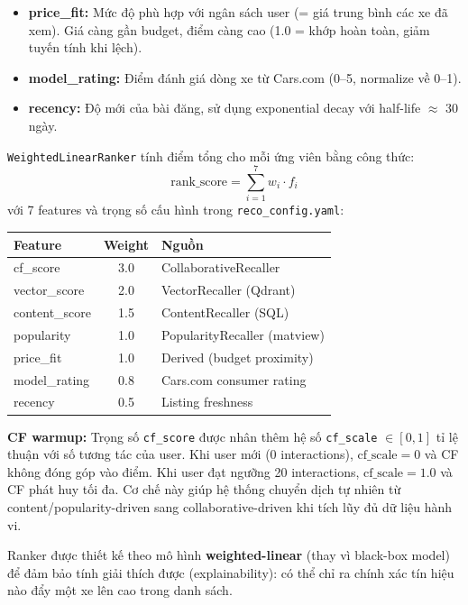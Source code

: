 \begin{itemize}
    \item \textbf{price\_fit:} Mức độ phù hợp với ngân sách user (= giá trung bình các xe đã xem). Giá càng gần budget, điểm càng cao (1.0 = khớp hoàn toàn, giảm tuyến tính khi lệch).
    \item \textbf{model\_rating:} Điểm đánh giá dòng xe từ Cars.com (0--5, normalize về 0--1).
    \item \textbf{recency:} Độ mới của bài đăng, sử dụng exponential decay với half-life $\approx$ 30 ngày.
\end{itemize}

\texttt{WeightedLinearRanker} tính điểm tổng cho mỗi ứng viên bằng công thức:
\[
\text{rank\_score} = \sum_{i=1}^{7} w_i \cdot f_i
\]
với 7 features và trọng số cấu hình trong \texttt{reco\_config.yaml}:

\begin{center}
\small
\begin{tabular}{|l|c|l|}
\hline
\textbf{Feature} & \textbf{Weight} & \textbf{Nguồn} \\
\hline
cf\_score & 3.0 & CollaborativeRecaller \\
\hline
vector\_score & 2.0 & VectorRecaller (Qdrant) \\
\hline
content\_score & 1.5 & ContentRecaller (SQL) \\
\hline
popularity & 1.0 & PopularityRecaller (matview) \\
\hline
price\_fit & 1.0 & Derived (budget proximity) \\
\hline
model\_rating & 0.8 & Cars.com consumer rating \\
\hline
recency & 0.5 & Listing freshness \\
\hline
\end{tabular}
\end{center}

\textbf{CF warmup:} Trọng số \texttt{cf\_score} được nhân thêm hệ số \texttt{cf\_scale} $\in [0, 1]$ tỉ lệ thuận với số tương tác của user. Khi user mới (0 interactions), $\text{cf\_scale} = 0$ và CF không đóng góp vào điểm. Khi user đạt ngưỡng 20 interactions, $\text{cf\_scale} = 1.0$ và CF phát huy tối đa. Cơ chế này giúp hệ thống chuyển dịch tự nhiên từ content/popularity-driven sang collaborative-driven khi tích lũy đủ dữ liệu hành vi.

Ranker được thiết kế theo mô hình \textbf{weighted-linear} (thay vì black-box model) để đảm bảo tính giải thích được (explainability): có thể chỉ ra chính xác tín hiệu nào đẩy một xe lên cao trong danh sách.

